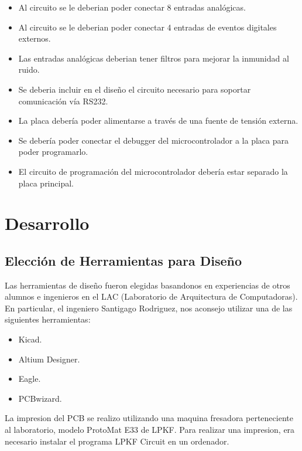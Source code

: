 \begin{itemize}
\item Al circuito se le deberian poder conectar 8 entradas analógicas.
\item Al circuito se le deberian poder conectar 4 entradas de eventos digitales externos.
\item Las entradas analógicas deberian tener filtros para mejorar la inmunidad al ruido.
\item Se deberia incluir en el diseño el circuito necesario para soportar comunicación vía RS232.
\item La placa debería poder alimentarse a través de una fuente de tensión externa.
\item Se debería poder conectar el debugger del microcontrolador a la placa para poder programarlo.
\item El circuito de programación del microcontrolador debería estar separado la placa principal.
\end{itemize}



\section{Desarrollo} %
\label{it3:sec:desarrollo}

\subsection{Elección de Herramientas para Diseño} %
\label{it3:sub:herramientas_para_diseno}

Las herramientas de diseño fueron elegidas basandonos en experiencias de otros alumnos e ingenieros en el LAC (Laboratorio de Arquitectura de Computadoras). En particular, el ingeniero Santigago Rodriguez, nos aconsejo utilizar una de las siguientes herramientas:

\begin{itemize}
\item Kicad.
\item Altium Designer.
\item Eagle.
\item PCBwizard.
\end{itemize}

La impresion del PCB se realizo utilizando una maquina fresadora perteneciente al laboratorio, modelo ProtoMat E33 de LPKF. Para realizar una impresion, era necesario instalar el programa LPKF Circuit en un ordenador.

